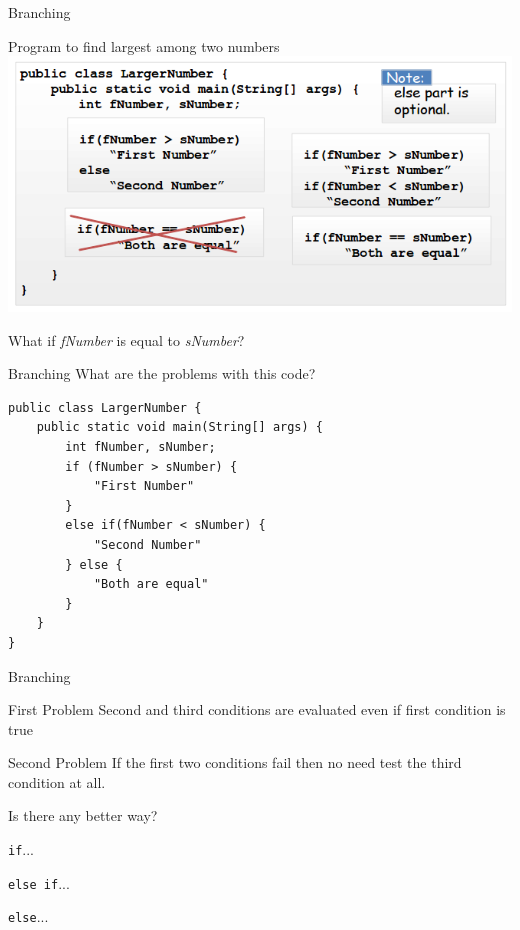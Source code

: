 \documentclass[12pt]{beamer}
\begin{document}
\begin{frame}[fragile]{Branching}
 \begin{block}{Program to find largest among two numbers}
  \includegraphics[scale=.45]{program-largest.png}
 \end{block}
What if \emph{fNumber} is equal to \emph{sNumber}? 
\end{frame}

\begin{frame}[fragile]{Branching}
 What are the problems with this code?
 
  \begin{lstlisting}[numbers=none]
public class LargerNumber {
    public static void main(String[] args) {
        int fNumber, sNumber;
        if (fNumber > sNumber) {
            "First Number"   
        } 
        else if(fNumber < sNumber) {
            "Second Number"
        } else {
            "Both are equal"
        }
    }
}
  \end{lstlisting}

\end{frame}

\begin{frame}{Branching}
 \begin{block}{First Problem}
  Second and third conditions are evaluated even if first condition is true
 \end{block}
 \begin{block}{Second Problem}
  If the first two conditions fail then no need test the third condition at all.
 \end{block}
 Is there any better way?
 \begin{center}
  
 \lstinline!if!...
 
 \lstinline!else if!...
 
 \lstinline!else!...
 \end{center}
\end{frame}
\end{document}
